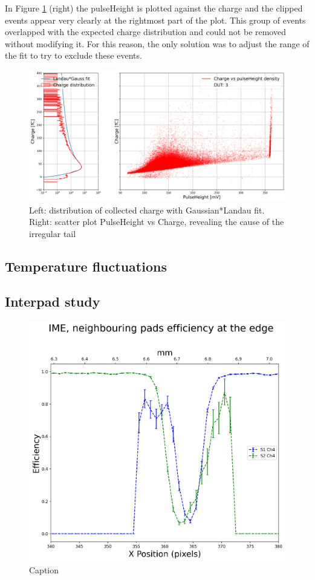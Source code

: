 In Figure \ref{fig:charge_vs_pulseHeight_for_clipping} (right) the pulseHeight is plotted against the charge and the clipped events appear very clearly at the rightmost part of the plot. This group of events overlapped with the expected charge distribution and could not be removed without modifying it. For this reason, the only solution was to adjust the range of the fit to try to exclude these events.

\begin{figure}
    \centering
    \includegraphics[width=1\linewidth]{Images/charge_plots/Charge_vs_pulseHeight_density_413_S2_dut3.png}
    \caption{Left: distribution of collected charge with Gaussian*Landau fit. Right: scatter plot PulseHeight vs Charge, revealing the cause of the irregular tail}
    \label{fig:charge_vs_pulseHeight_for_clipping}
\end{figure}


\subsection{Temperature fluctuations}\label{sec:temperature_fluctuations}




\subsection{Interpad study}\label{sec:neighbouring_pads}
\begin{figure}
    \centering
    \includegraphics[width=0.5\linewidth]{Images/detailed_analysis/batch 401 duts:3 and 3, edge efficiency studies.png}
    \caption{Caption}
    \label{fig:neighbouring_pads}
\end{figure}
